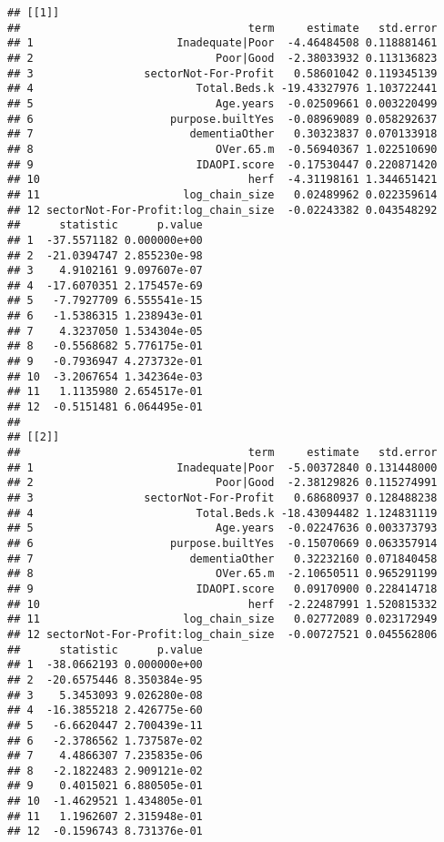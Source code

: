 \documentclass[]{article}
\begin{document}
\begin{verbatim}
## [[1]]
##                                   term     estimate   std.error
## 1                      Inadequate|Poor  -4.46484508 0.118881461
## 2                            Poor|Good  -2.38033932 0.113136823
## 3                 sectorNot-For-Profit   0.58601042 0.119345139
## 4                         Total.Beds.k -19.43327976 1.103722441
## 5                            Age.years  -0.02509661 0.003220499
## 6                     purpose.builtYes  -0.08969089 0.058292637
## 7                        dementiaOther   0.30323837 0.070133918
## 8                            OVer.65.m  -0.56940367 1.022510690
## 9                         IDAOPI.score  -0.17530447 0.220871420
## 10                                herf  -4.31198161 1.344651421
## 11                      log_chain_size   0.02489962 0.022359614
## 12 sectorNot-For-Profit:log_chain_size  -0.02243382 0.043548292
##      statistic      p.value
## 1  -37.5571182 0.000000e+00
## 2  -21.0394747 2.855230e-98
## 3    4.9102161 9.097607e-07
## 4  -17.6070351 2.175457e-69
## 5   -7.7927709 6.555541e-15
## 6   -1.5386315 1.238943e-01
## 7    4.3237050 1.534304e-05
## 8   -0.5568682 5.776175e-01
## 9   -0.7936947 4.273732e-01
## 10  -3.2067654 1.342364e-03
## 11   1.1135980 2.654517e-01
## 12  -0.5151481 6.064495e-01
## 
## [[2]]
##                                   term     estimate   std.error
## 1                      Inadequate|Poor  -5.00372840 0.131448000
## 2                            Poor|Good  -2.38129826 0.115274991
## 3                 sectorNot-For-Profit   0.68680937 0.128488238
## 4                         Total.Beds.k -18.43094482 1.124831119
## 5                            Age.years  -0.02247636 0.003373793
## 6                     purpose.builtYes  -0.15070669 0.063357914
## 7                        dementiaOther   0.32232160 0.071840458
## 8                            OVer.65.m  -2.10650511 0.965291199
## 9                         IDAOPI.score   0.09170900 0.228414718
## 10                                herf  -2.22487991 1.520815332
## 11                      log_chain_size   0.02772089 0.023172949
## 12 sectorNot-For-Profit:log_chain_size  -0.00727521 0.045562806
##      statistic      p.value
## 1  -38.0662193 0.000000e+00
## 2  -20.6575446 8.350384e-95
## 3    5.3453093 9.026280e-08
## 4  -16.3855218 2.426775e-60
## 5   -6.6620447 2.700439e-11
## 6   -2.3786562 1.737587e-02
## 7    4.4866307 7.235835e-06
## 8   -2.1822483 2.909121e-02
## 9    0.4015021 6.880505e-01
## 10  -1.4629521 1.434805e-01
## 11   1.1962607 2.315948e-01
## 12  -0.1596743 8.731376e-01

\end{verbatim}
\end{document}
